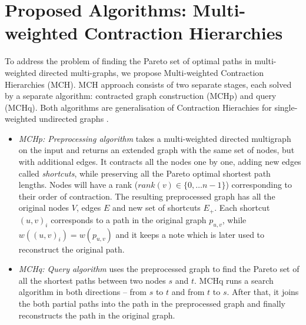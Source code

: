 
\section{Proposed Algorithms: Multi-weighted Contraction Hierarchies}
\label{secAlgorithms}

To address the problem of finding the Pareto set of optimal paths in multi-weighted directed multi-graphs, we propose Multi-weighted Contraction Hierarchies (MCH). 
MCH approach consists of two separate stages, each solved by a separate algorithm: contracted graph construction (MCHp) and query (MCHq). 
Both algorithms are generalisation of Contraction Hierachies for single-weighted undirected graphs \cite{geisberger2008contraction}.

\begin{itemize}
  \item {\em MCHp: Preprocessing algorithm} takes a multi-weighted directed multigraph on the input and returns an extended graph with the same set of nodes, but with additional edges. It contracts all the nodes one by one, adding new edges called \emph{shortcuts}, while preserving all the Pareto optimal shortest path lengths. 
Nodes will have a rank ($rank(v) \in \{0, \dots n-1\}$) corresponding to their order of contraction.
The resulting preprocessed graph has all the original nodes $V$, edges $E$ and new set of shortcuts $E_+$.
Each shortcut $(u,v)_i$ corresponds to a path in the original graph $p_{u,v}$, while $w((u,v)_i) = w(p_{u,v})$ and it keeps a note which is later used to reconstruct the original path.
  \item {\em MCHq: Query algorithm} uses the preprocessed graph to find the Pareto set of all
the shortest paths between two nodes $s$ and $t$. MCHq runs a search algorithm in both directions -- from $s$ to $t$ and from $t$ to $s$. After that, it joins the both partial paths into the path in the preprocessed graph and finally reconstructs the path in the original graph. 
\end{itemize}




